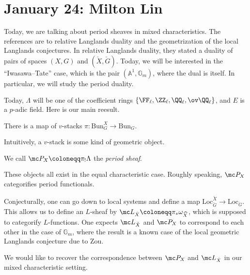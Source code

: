 \documentclass{article}
\begin{document}
\section{January 24: Milton Lin}
Today, we are talking about period sheaves in mixed characteristics. The references are to relative Langlands duality and the geometrization of the local Langlands conjectures. In relative Langlands duality, they stated a duality of pairs of spaces $(X,G)$ and $(\check X,\check G)$. Today, we will be interested in the ``Iwasawa--Tate'' case, which is the pair $(\mathbb A^1,\mathbb G_m)$, where the dual is itself. In particular, we will study the period duality.

Today, $\Lambda$ will be one of the coefficient rings $\{\FF_\ell,\ZZ_\ell,\QQ_\ell,\ov\QQ_\ell\}$, and $E$ is a $p$-adic field. Here is our main reesult.
\begin{proposition}
	There is a map of $v$-stacks $\pi\colon\mathrm{Bun}_G^X\to\mathrm{Bun}_G$.
\end{proposition}
Intuitively, a $v$-stack is some kind of geometric object.
\begin{definition}
	We call $\mc P_X\coloneqq\pi_!\Lambda$ the \textit{period sheaf}.
\end{definition}
\begin{remark}
	These objects all exist in the equal characteristic case. Roughly speaking, $\mc P_X$ categorifies period functionals.
\end{remark}
\begin{remark}
	Conjecturally, one can go down to local systems and define a map $\mathrm{Loc}_{\check G}^{\check X}\to\mathrm{Loc}_{\check G}$. This allows us to define an $L$-sheaf by $\mc L_{\check X}\coloneqq\pi_*\omega_{\widehat X}$, which is supposed to categorify $L$-functions. One expects $\mc L_{\check X}$ and $\mc P_X$ to correspond to each other in the case of $\mathbb G_m$, where the result is a known case of the local geometric Langlands conjecture due to Zou.
\end{remark}
We would like to recover the correspondence between $\mc P_X$ and $\mc L_{\check X}$ in our mixed characteristic setting.
\end{document}
